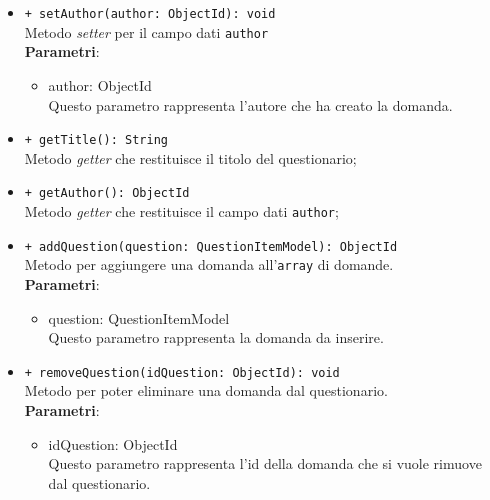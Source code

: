 \begin{itemize}
\begin{itemize}
				\item \texttt{+ setAuthor(author: ObjectId): void} \\
				Metodo \textit{setter} per il campo dati \texttt{author}\\
				\textbf{Parametri}:
				\begin{itemize}
					\item {author: ObjectId}\\
					Questo parametro rappresenta l'autore che ha creato la domanda.
				\end{itemize}
				
				\item \texttt{+ getTitle(): String} \\
				Metodo \textit{getter} che restituisce il titolo del questionario;
				
				\item \texttt{+ getAuthor(): ObjectId} \\
				Metodo \textit{getter} che restituisce il campo dati \texttt{author};
				
				\item \texttt{+ addQuestion(question: QuestionItemModel): ObjectId} \\
				Metodo per aggiungere una domanda all'\texttt{array} di domande.\\
				\textbf{Parametri}:
				\begin{itemize}
					\item {question: QuestionItemModel}\\
					Questo parametro rappresenta la domanda da inserire.
				\end{itemize}
				
				\item \texttt{+ removeQuestion(idQuestion: ObjectId): void} \\
				Metodo per poter eliminare una domanda dal questionario.\\
				\textbf{Parametri}:
				\begin{itemize}
					\item {idQuestion: ObjectId}\\
					Questo parametro rappresenta l'id della domanda che si vuole rimuove dal questionario.
				\end{itemize}
				
				
			\end{itemize}
		\end{itemize}	
		
		